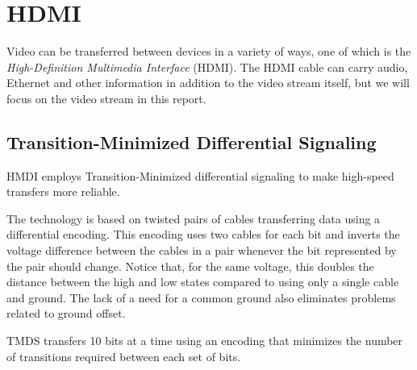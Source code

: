 \section{HDMI}
Video can be transferred between devices in a variety of ways, one of which is the \emph{High-Definition Multimedia Interface} (HDMI).
The HDMI cable can carry audio, Ethernet and other information in addition to the video stream itself, but we will focus on the video stream in this report.

\subsection{Transition-Minimized Differential Signaling}
HMDI employs Transition-Minimized differential signaling to make high-speed transfers more reliable.

The technology is based on twisted pairs of cables transferring data using a differential encoding.
This encoding uses two cables for each bit and inverts the voltage difference between the cables in a pair whenever the bit represented by the pair should change.
Notice that, for the same voltage, this doubles the distance between the high and low states compared to using only a single cable and ground.
The lack of a need for a common ground also eliminates problems related to ground offset.

TMDS transfers 10 bits at a time using an encoding that minimizes the number of transitions required between each set of bits.
